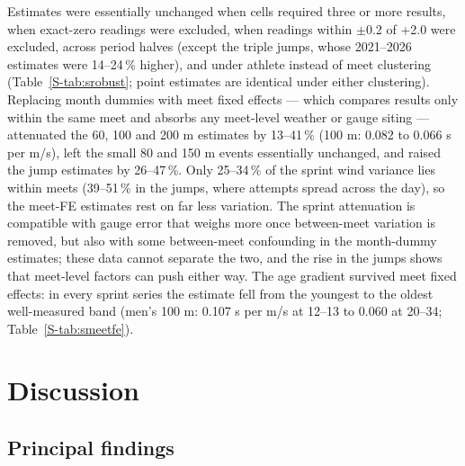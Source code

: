 \documentclass[12pt,a4paper]{article}
\begin{document}
Estimates were essentially unchanged when cells required three or more results, when exact-zero readings were excluded, when readings within $\pm$0.2 of +2.0 were excluded, across period halves (except the triple jumps, whose 2021--2026 estimates were 14--24\,\% higher), and under athlete instead of meet clustering (Table~\ref{S-tab:srobust}; point estimates are identical under either clustering). Replacing month dummies with meet fixed effects --- which compares results only within the same meet and absorbs any meet-level weather or gauge siting --- attenuated the 60, 100 and 200 m estimates by 13--41\,\% (100 m: 0.082 to 0.066 s per m/s), left the small 80 and 150 m events essentially unchanged, and raised the jump estimates by 26--47\,\%. Only 25--34\,\% of the sprint wind variance lies within meets (39--51\,\% in the jumps, where attempts spread across the day), so the meet-FE estimates rest on far less variation. The sprint attenuation is compatible with gauge error that weighs more once between-meet variation is removed, but also with some between-meet confounding in the month-dummy estimates; these data cannot separate the two, and the rise in the jumps shows that meet-level factors can push either way. The age gradient survived meet fixed effects: in every sprint series the estimate fell from the youngest to the oldest well-measured band (men's 100 m: 0.107 s per m/s at 12--13 to 0.060 at 20--34; Table~\ref{S-tab:smeetfe}).
\section{Discussion}

\subsection{Principal findings}
\end{document}
